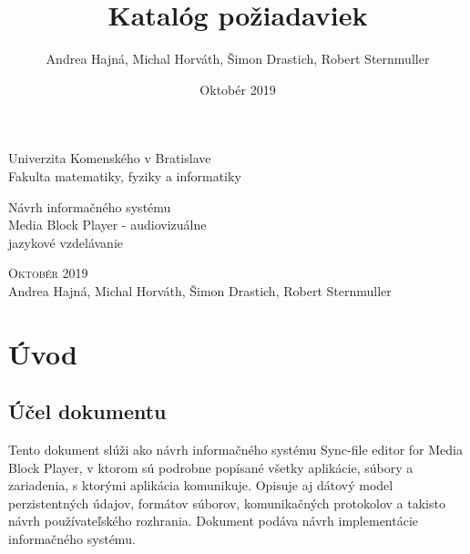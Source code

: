 \documentclass{article}
\title{Katalóg požiadaviek}
\author{Andrea Hajná, Michal Horváth, Šimon Drastich, Robert Sternmuller}
\date{Oktobér 2019}
\begin{document}


\thispagestyle{empty}

\begin{center}
\sc\large
Univerzita Komenského v Bratislave\\
Fakulta matematiky, fyziky a informatiky


\vfill

{\huge Návrh informačného systému }\\
Media Block Player - audiovizuálne \\ jazykové vzdelávanie
\end{center}

\vfill

{
\noindent
\textsc{Oktobér 2019}\\
Andrea Hajná, Michal Horváth, Šimon Drastich, Robert Sternmuller
}

\newpage


\tableofcontents

\newpage


\section{Úvod}

\subsection{Účel dokumentu }
Tento dokument slúži ako návrh informačného systému Sync-file editor for Media Block Player, v ktorom sú podrobne popísané všetky aplikácie, súbory a zariadenia, s ktorými aplikácia komunikuje. Opisuje aj dátový model perzistentných údajov, formátov súborov, komunikačných protokolov a takisto návrh používateľského rozhrania. Dokument podáva návrh implementácie informačného systému.
\end{document}
